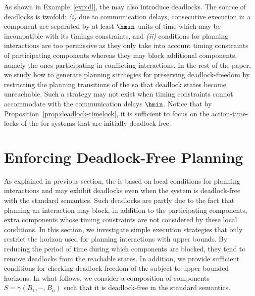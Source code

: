As shown in Example~\ref{exp:dl}, the \lps may also introduce deadlocks.
The source of deadlocks is twofold: \emph{(i)} due to communication delays, consecutive execution in a component are separated by at least $\hmin$ units of time which may be incompatible with its timings constraints, and \emph{(ii)} conditions for planning interactions are too permissive as they only take into account timing constraints of participating components whereas they may block additional components, namely the ones participating in conflicting interactions.
In the rest of the paper, we study how to generate planning strategies for preserving deadlock-freedom by restricting the planning transitions of the \lpsabr so that deadlock states become unreachable.
Such a strategy may not exist when timing constraints cannot accommodate with the communication delays $\hmin$.
Notice that by Proposition~\ref{prop:deadlock-timelock}, it is sufficient to focus on the action-time-locks of the \lpsabr for systems that are initially deadlock-free.

\section{Enforcing Deadlock-Free Planning}
\label{sec4}
As explained in previous section, the \lps is based on local conditions for planning interactions and may exhibit deadlocks even when the system is deadlock-free with the standard semantics.
Such deadlocks are partly due to the fact that planning an interaction may block, in addition to the participating components, extra components whose timing constraints are not considered by these local conditions.
In this section, we investigate simple execution strategies that only restrict the horizon used for planning interactions with upper bounds.
By reducing the period of time during which components are blocked, they tend to remove deadlocks from the reachable states.
In addition, we provide sufficient conditions for checking deadlock-freedom of the \lpsabr subject to upper bounded horizons.
In what follows, we consider a composition of components $S = \gamma(B_1,\cdots,B_n)$ such that it is deadlock-free in the standard semantics.
